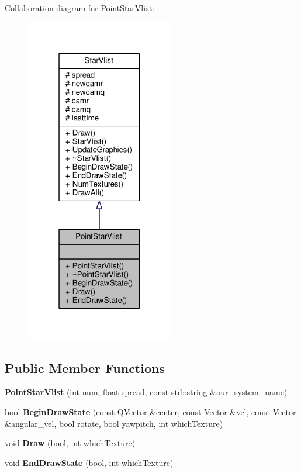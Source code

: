 Collaboration diagram for Point\+Star\+Vlist\+:
\nopagebreak
\begin{figure}[H]
\begin{center}
\leavevmode
\includegraphics[width=183pt]{d1/dea/classPointStarVlist__coll__graph}
\end{center}
\end{figure}
\subsection*{Public Member Functions}
\begin{DoxyCompactItemize}
\item 
{\bfseries Point\+Star\+Vlist} (int num, float spread, const std\+::string \&our\+\_\+system\+\_\+name)\hypertarget{classPointStarVlist_ad7ce94241b6abdaffb8f4551bff497fa}{}\label{classPointStarVlist_ad7ce94241b6abdaffb8f4551bff497fa}

\item 
bool {\bfseries Begin\+Draw\+State} (const Q\+Vector \&center, const Vector \&vel, const Vector \&angular\+\_\+vel, bool rotate, bool yawpitch, int which\+Texture)\hypertarget{classPointStarVlist_a5713b5620439310adece653671684571}{}\label{classPointStarVlist_a5713b5620439310adece653671684571}

\item 
void {\bfseries Draw} (bool, int which\+Texture)\hypertarget{classPointStarVlist_aaecc5aab6d3a509e08d679087fbf0c8f}{}\label{classPointStarVlist_aaecc5aab6d3a509e08d679087fbf0c8f}

\item 
void {\bfseries End\+Draw\+State} (bool, int which\+Texture)\hypertarget{classPointStarVlist_aef8e6e38b8ae6115c2decc66ee15e51b}{}\label{classPointStarVlist_aef8e6e38b8ae6115c2decc66ee15e51b}

\end{DoxyCompactItemize}
